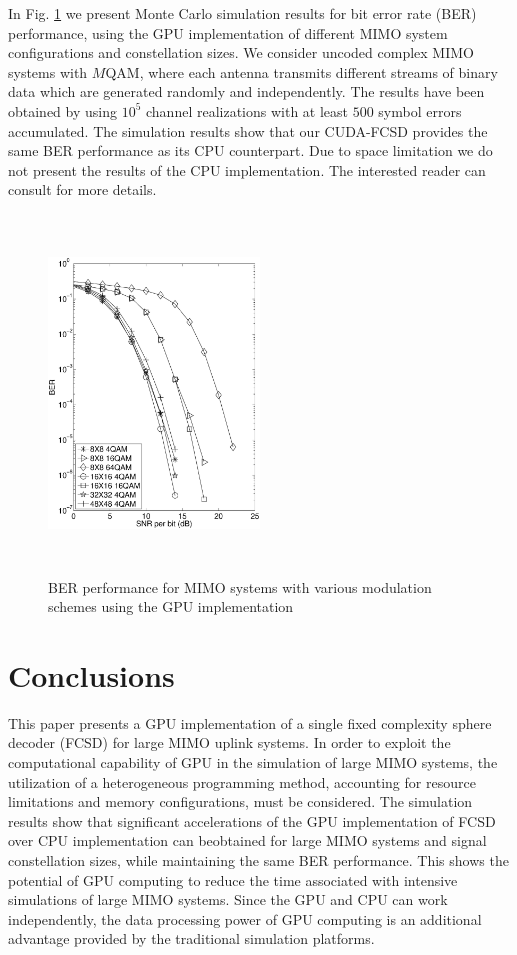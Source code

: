 \documentclass[letterpaper, 10pt, conference, twoside]{ieeeconf}
\begin{document}
In Fig. \ref{BER curve} we present Monte Carlo simulation results for bit error rate (BER) performance, using the GPU implementation of different MIMO system configurations and constellation sizes. We consider uncoded complex MIMO systems with $M$QAM, where each antenna transmits different streams of binary data which are generated randomly and independently. The results have been obtained by using $10^{5}$ channel realizations with at least $500$ symbol errors accumulated. The simulation results show that our CUDA-FCSD provides the same BER performance as its CPU counterpart. Due to space limitation we do not present the results of the CPU implementation. The interested reader can consult \cite{barbero2008fixing} for more details.
\begin{figure}[htb]
\centering
\includegraphics*[width=0.5\textwidth, height=9.5cm]{BER_curves.eps}
\caption{BER performance for MIMO systems with various modulation schemes using the GPU implementation}
\label{BER curve}
\end{figure}
\section{Conclusions}\label{conclusion}
This paper presents a GPU implementation of a single fixed complexity sphere decoder (FCSD) for large MIMO  uplink systems. In order to exploit the computational capability of GPU in the simulation of large MIMO systems, the utilization of a heterogeneous programming method, accounting for resource limitations and memory configurations, must be considered. The simulation results show that significant accelerations of the GPU implementation of FCSD over CPU implementation can be\newline\newline\newline\newline\newline obtained for large MIMO systems and signal constellation sizes, while maintaining the same BER performance. This shows the potential of GPU computing to reduce the time associated with intensive simulations of large MIMO systems. Since the GPU and CPU can work independently, the data processing power of GPU computing is an additional advantage provided by the traditional simulation platforms. 
\end{document}
